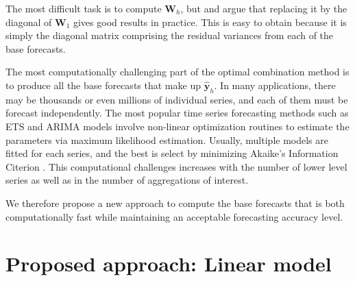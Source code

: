 \documentclass[11pt,a4paper,]{article}
\begin{document}
The most difficult task is to compute \(\bm{W}_h\), but
\textcite{mint2018} and \textcite{hyndman2016fast} argue that replacing
it by the diagonal of \(\bm{W}_1\) gives good results in practice. This
is easy to obtain because it is simply the diagonal matrix comprising
the residual variances from each of the base forecasts.

The most computationally challenging part of the optimal combination
method is to produce all the base forecasts that make up
\(\hat{\bm{y}}_h\). In many applications, there may be thousands or even
millions of individual series, and each of them must be forecast
independently. The most popular time series forecasting methods such as
ETS and ARIMA models \autocite{fpp2} involve non-linear optimization
routines to estimate the parameters via maximum likelihood estimation.
Usually, multiple models are fitted for each series, and the best is
select by minimizing Akaike's Information Citerion
\autocite{akaike1998information}. This computational challenges
increases with the number of lower level series as well as in the number
of aggregations of interest.

We therefore propose a new approach to compute the base forecasts that
is both computationally fast while maintaining an acceptable forecasting
accuracy level.

\hypertarget{proposed-approach-linear-model}{%
\section{\texorpdfstring{Proposed approach: Linear model
\label{sec:proposedapproach1}}{Proposed approach: Linear model }}\label{proposed-approach-linear-model}}
\end{document}
